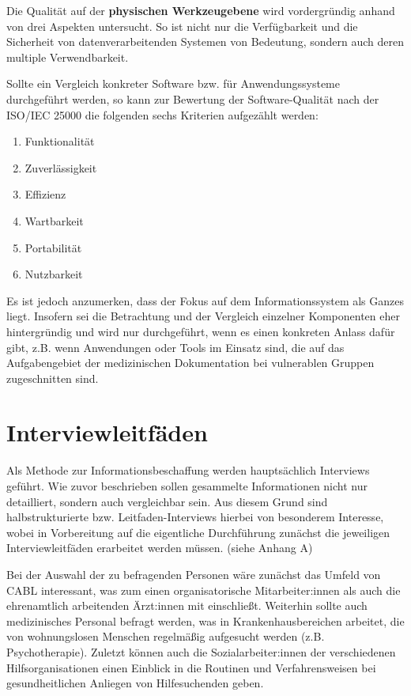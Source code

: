 Die Qualität auf der \textbf{physischen Werkzeugebene} wird vordergründig anhand von drei Aspekten untersucht. So ist nicht nur die Verfügbarkeit und die Sicherheit von datenverarbeitenden Systemen von Bedeutung, sondern auch deren multiple Verwendbarkeit.

Sollte ein Vergleich konkreter Software bzw. für Anwendungssysteme durchgeführt werden, so kann zur Bewertung der Software-Qualität nach der ISO/IEC 25000 die folgenden sechs Kriterien aufgezählt werden:

\begin{enumerate}
	\item Funktionalität
	\item Zuverlässigkeit
	\item Effizienz
	\item Wartbarkeit
	\item Portabilität
	\item Nutzbarkeit
\end{enumerate}

Es ist jedoch anzumerken, dass der Fokus auf dem Informationssystem als Ganzes liegt. Insofern sei die Betrachtung und der Vergleich einzelner Komponenten eher hintergründig und wird nur durchgeführt, wenn es einen konkreten Anlass dafür gibt, z.B. wenn Anwendungen oder Tools im Einsatz sind, die auf das Aufgabengebiet der medizinischen Dokumentation bei vulnerablen Gruppen zugeschnitten sind.


\section{Interviewleitfäden}

Als Methode zur Informationsbeschaffung werden hauptsächlich Interviews geführt. Wie zuvor beschrieben sollen gesammelte Informationen nicht nur detailliert, sondern auch vergleichbar sein. Aus diesem Grund sind halbstrukturierte bzw. Leitfaden-Interviews hierbei von besonderem Interesse, wobei in Vorbereitung auf die eigentliche Durchführung zunächst die jeweiligen Interviewleitfäden erarbeitet werden müssen. (siehe Anhang A)

Bei der Auswahl der zu befragenden Personen wäre zunächst das Umfeld von CABL interessant, was zum einen organisatorische Mitarbeiter:innen als auch die ehrenamtlich arbeitenden Ärzt:innen mit einschließt. Weiterhin sollte auch medizinisches Personal befragt werden, was in Krankenhausbereichen arbeitet, die von wohnungslosen Menschen regelmäßig aufgesucht werden (z.B. Psychotherapie). Zuletzt können auch die Sozialarbeiter:innen der verschiedenen Hilfsorganisationen einen Einblick in die Routinen und Verfahrensweisen bei gesundheitlichen Anliegen von Hilfesuchenden geben.

